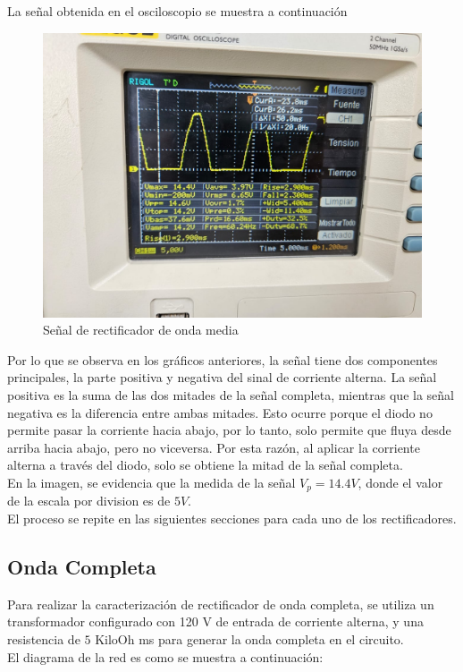 \documentclass[10pt,letterpaper]{article}
\begin{document}
La señal obtenida en el osciloscopio se muestra a continuación

\begin{figure}[H]
    \centering
    \includegraphics[scale=0.387]{Osc_OndaMedia.jpg}
    \caption{Señal de rectificador de onda media}
    \label{SeñalMedia}
\end{figure}

Por lo que se observa en los gráficos anteriores, la señal tiene dos componentes principales,
la parte positiva y negativa del sinal de corriente alterna. La señal positiva es la suma de las
dos mitades de la señal completa, mientras que la señal negativa es la diferencia entre ambas
mitades. Esto ocurre porque el diodo no permite pasar la corriente hacia abajo, por lo tanto, solo
permite que fluya desde arriba hacia abajo, pero no viceversa. Por esta razón, al aplicar la
corriente alterna a través del diodo, solo se obtiene la mitad de la señal completa.\\

En la imagen, se evidencia que la medida de la señal $V_p=14.4 V$, donde el valor de la escala
por division es de $5V$.\\

El proceso se repite en las siguientes secciones para  cada uno de los rectificadores.



\subsection{Onda Completa}

Para realizar la caracterización de rectificador de onda completa, se utiliza un transformador
configurado con 120 V de entrada de corriente alterna, y una resistencia de $5$ KiloOh
ms para generar la onda completa en el circuito. \\ El diagrama de la red es como se muestra
a continuación:
\end{document}
